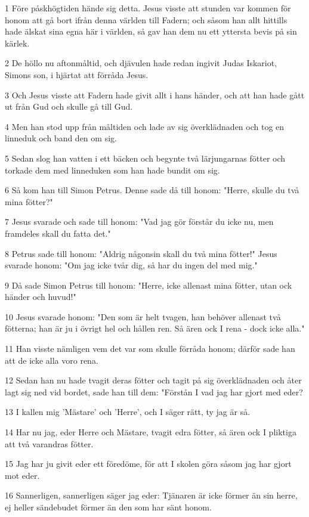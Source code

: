 \par 1 Före påskhögtiden hände sig detta. Jesus visste att stunden var kommen för honom att gå bort ifrån denna världen till Fadern; och såsom han allt hittills hade älskat sina egna här i världen, så gav han dem nu ett yttersta bevis på sin kärlek.
\par 2 De höllo nu aftonmåltid, och djävulen hade redan ingivit Judas Iskariot, Simons son, i hjärtat att förråda Jesus.
\par 3 Och Jesus visste att Fadern hade givit allt i hans händer, och att han hade gått ut från Gud och skulle gå till Gud.
\par 4 Men han stod upp från måltiden och lade av sig överklädnaden och tog en linneduk och band den om sig.
\par 5 Sedan slog han vatten i ett bäcken och begynte två lärjungarnas fötter och torkade dem med linneduken som han hade bundit om sig.
\par 6 Så kom han till Simon Petrus. Denne sade då till honom: "Herre, skulle du två mina fötter?"
\par 7 Jesus svarade och sade till honom: "Vad jag gör förstår du icke nu, men framdeles skall du fatta det."
\par 8 Petrus sade till honom: "Aldrig någonsin skall du två mina fötter!" Jesus svarade honom: "Om jag icke tvår dig, så har du ingen del med mig."
\par 9 Då sade Simon Petrus till honom: "Herre, icke allenast mina fötter, utan ock händer och huvud!"
\par 10 Jesus svarade honom: "Den som är helt tvagen, han behöver allenast två fötterna; han är ju i övrigt hel och hållen ren. Så ären ock I rena - dock icke alla."
\par 11 Han visste nämligen vem det var som skulle förråda honom; därför sade han att de icke alla voro rena.
\par 12 Sedan han nu hade tvagit deras fötter och tagit på sig överklädnaden och åter lagt sig ned vid bordet, sade han till dem: "Förstån I vad jag har gjort med eder?
\par 13 I kallen mig 'Mästare' och 'Herre', och I säger rätt, ty jag är så.
\par 14 Har nu jag, eder Herre och Mästare, tvagit edra fötter, så ären ock I pliktiga att två varandras fötter.
\par 15 Jag har ju givit eder ett föredöme, för att I skolen göra såsom jag har gjort mot eder.
\par 16 Sannerligen, sannerligen säger jag eder: Tjänaren är icke förmer än sin herre, ej heller sändebudet förmer än den som har sänt honom.
